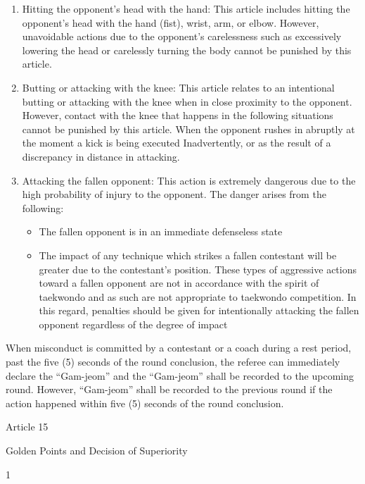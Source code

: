 \documentclass[
]{report}
\providecommand{\tightlist}{%
  \setlength{\itemsep}{0pt}\setlength{\parskip}{0pt}}
\renewcommand{\labelenumi}{\arabic{enumi}}
\begin{document}
\begin{enumerate}
\def\labelenumi{\roman{enumi}.}
\setcounter{enumi}{7}
\item
  Hitting the opponent's head with the hand: This article includes
  hitting the opponent's head with the hand (fist), wrist, arm, or
  elbow. However, unavoidable actions due to the opponent's carelessness
  such as excessively lowering the head or carelessly turning the body
  cannot be punished by this article.
\item
  Butting or attacking with the knee: This article relates to an
  intentional butting or attacking with the knee when in close proximity
  to the opponent. However, contact with the knee that happens in the
  following situations cannot be punished by this article. When the
  opponent rushes in abruptly at the moment a kick is being executed
  Inadvertently, or as the result of a discrepancy in distance in
  attacking.
\item
  Attacking the fallen opponent: This action is extremely dangerous due
  to the high probability of injury to the opponent. The danger arises
  from the following:

  \begin{itemize}
  \tightlist
  \item
    The fallen opponent is in an immediate defenseless state
  \item
    The impact of any technique which strikes a fallen contestant will
    be greater due to the contestant's position. These types of
    aggressive actions toward a fallen opponent are not in accordance
    with the spirit of taekwondo and as such are not appropriate to
    taekwondo competition. In this regard, penalties should be given for
    intentionally attacking the fallen opponent regardless of the degree
    of impact
  \end{itemize}
\end{enumerate}

When misconduct is committed by a contestant or a coach during a rest
period, past the five (5) seconds of the round conclusion, the referee
can immediately declare the ``Gam-jeom'' and the ``Gam-jeom'' shall be
recorded to the upcoming round. However, ``Gam-jeom'' shall be recorded
to the previous round if the action happened within five (5) seconds of
the round conclusion.

Article 15

Golden Points and Decision of Superiority

1
\end{document}
